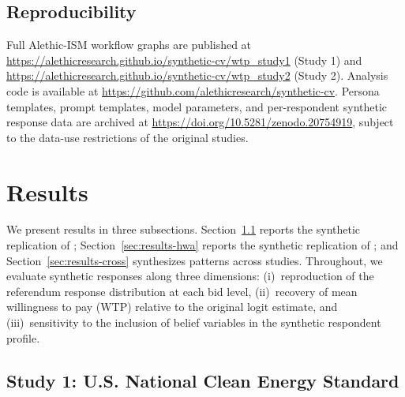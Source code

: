 \documentclass[12pt]{article}
\begin{document}
\subsection{Reproducibility}\label{sec:methods-reproducibility}

Full Alethic-ISM workflow graphs are published at
\url{https://alethicresearch.github.io/synthetic-cv/wtp_study1}
(Study 1) and \url{https://alethicresearch.github.io/synthetic-cv/wtp_study2}
(Study 2). Analysis code is available at \url{https://github.com/alethicresearch/synthetic-cv}. Persona templates,
prompt templates, model parameters, and per-respondent synthetic response data are archived at \url{https://doi.org/10.5281/zenodo.20754919}, subject to the data-use restrictions of the original studies.
%

\section{Results}\label{sec:results}

We present results in three subsections. Section~\ref{sec:results-nces}
reports the synthetic replication of \textcite{Aldy2012};
Section~\ref{sec:results-hwa} reports the synthetic replication of
\textcite{Giguere2020}; and Section~\ref{sec:results-cross} synthesizes
patterns across studies. Throughout, we evaluate synthetic responses along
three dimensions: (i)~reproduction of the referendum response distribution
at each bid level, (ii)~recovery of mean willingness to pay (WTP) relative
to the original logit estimate, and (iii)~sensitivity to the inclusion of
belief variables in the synthetic respondent profile.

\subsection{Study 1: U.S. National Clean Energy Standard}\label{sec:results-nces}

\end{document}
